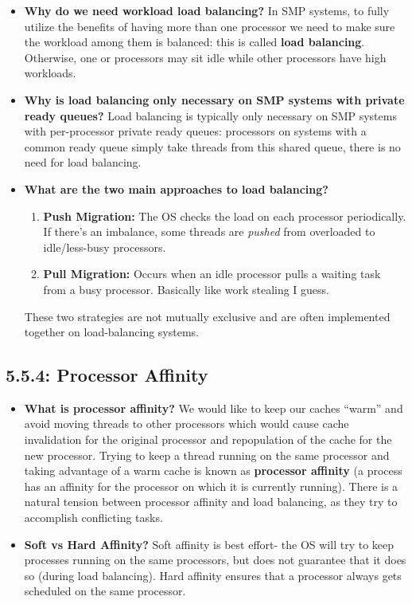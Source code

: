 \documentclass[12pt]{article}
\begin{document}
\begin{itemize}
    \item \textbf{Why do we need workload load balancing?} In SMP systems, to fully utilize the benefits of having more than one processor we need to make sure the workload among them is balanced: this is called \textbf{load balancing}. Otherwise, one or processors may sit idle while other processors have high workloads.
    \item \textbf{Why is load balancing only necessary on SMP systems with private ready queues?} Load balancing is typically only necessary on SMP systems with per-processor private ready queues: processors on systems with a common ready queue simply take threads from this shared queue, there is no need for load balancing.
    \item \textbf{What are the two main approaches to load balancing?}
        \begin{enumerate}
            \item \textbf{Push Migration:} The OS checks the load on each processor periodically. If there's an imbalance, some threads are \textit{pushed} from overloaded to idle/less-busy processors.
            \item \textbf{Pull Migration:} Occurs when an idle processor pulls a waiting task from a busy processor. Basically like work stealing I guess.
        \end{enumerate}
        These two strategies are not mutually exclusive and are often implemented together on load-balancing systems.
\end{itemize}

\subsection*{5.5.4: Processor Affinity}

\begin{itemize}
    \item \textbf{What is processor affinity?} We would like to keep our caches ``warm'' and avoid moving threads to other processors which would cause cache invalidation for the original processor and repopulation of the cache for the new processor. Trying to keep a thread running on the same processor and taking advantage of a warm cache is known as \textbf{processor affinity} (a process has an affinity for the processor on which it is currently running). There is a natural tension between processor affinity and load balancing, as they try to accomplish conflicting tasks.
    \item \textbf{Soft vs Hard Affinity?} Soft affinity is best effort- the OS will try to keep processes running on the same processors, but does not guarantee that it does so (during load balancing). Hard affinity ensures that a processor always gets scheduled on the same processor.
\end{itemize}
\end{document}
